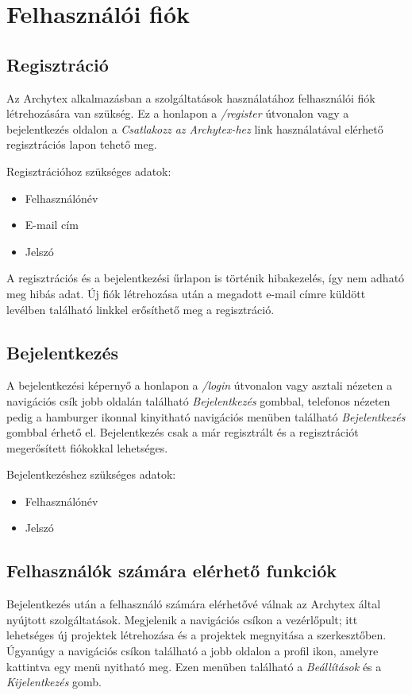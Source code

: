 \section{Felhasználói fiók}

\subsection{Regisztráció}
Az Archytex alkalmazásban a szolgáltatások használatához felhasználói fiók létrehozására van szükség. Ez a honlapon a \emph{/register} útvonalon vagy a bejelentkezés oldalon a \emph{Csatlakozz az Archytex-hez} link használatával elérhető regisztrációs lapon tehető meg.

\begin{samepage}
  \noindent Regisztrációhoz szükséges adatok:
  \begin{itemize}
    \item Felhasználónév
    \item E-mail cím
    \item Jelszó
  \end{itemize}
\end{samepage}

A regisztrációs és a bejelentkezési űrlapon is történik hibakezelés, így nem adható meg hibás adat. Új fiók létrehozása után a megadott e-mail címre küldött levélben található linkkel erősíthető meg a regisztráció.

\subsection{Bejelentkezés}
A bejelentkezési képernyő a honlapon a \emph{/login} útvonalon vagy asztali nézeten a navigációs csík jobb oldalán található \emph{Bejelentkezés} gombbal, telefonos nézeten pedig a hamburger ikonnal kinyitható navigációs menüben található \emph{Bejelentkezés} gombbal érhető el. Bejelentkezés csak a már regisztrált és a regisztrációt megerősített fiókokkal lehetséges.

\begin{samepage}
  \noindent Bejelentkezéshez szükséges adatok:
  \begin{itemize}
    \item Felhasználónév
    \item Jelszó
  \end{itemize}
\end{samepage}

\subsection{Felhasználók számára elérhető funkciók}
Bejelentkezés után a felhasználó számára elérhetővé válnak az Archytex által nyújtott szolgáltatások. Megjelenik a navigációs csíkon a vezérlőpult; itt lehetséges új projektek létrehozása és a projektek megnyitása a szerkesztőben. Úgyanúgy a navigációs csíkon található a jobb oldalon a profil ikon, amelyre kattintva egy menü nyitható meg. Ezen menüben található a \emph{Beállítások} és a \emph{Kijelentkezés} gomb.

